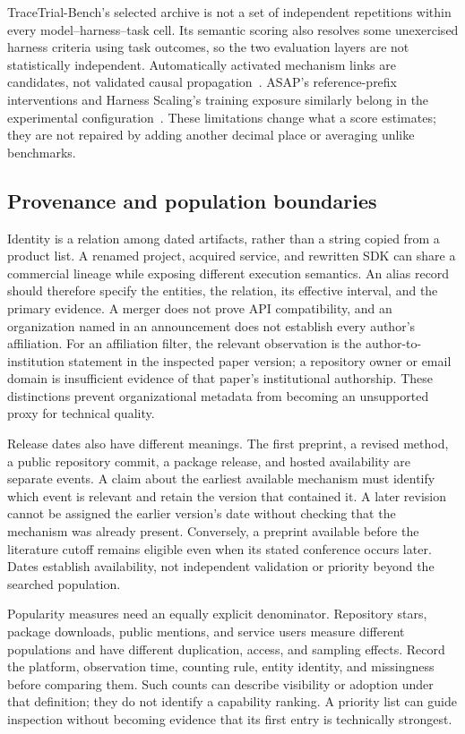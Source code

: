 TraceTrial-Bench's selected archive is not a set of independent repetitions within every model--harness--task cell. Its semantic scoring also resolves some unexercised harness criteria using task outcomes, so the two evaluation layers are not statistically independent. Automatically activated mechanism links are candidates, not validated causal propagation~\cite{ch01_tracetrial2026}. ASAP's reference-prefix interventions and Harness Scaling's training exposure similarly belong in the experimental configuration~\cite{ch01_asap2026,ch01_harnessscaling2026}. These limitations change what a score estimates; they are not repaired by adding another decimal place or averaging unlike benchmarks.

\subsection{Provenance and population boundaries}\label{sec:C01:provenance}
Identity is a relation among dated artifacts, rather than a string copied from a product list. A renamed project, acquired service, and rewritten SDK can share a commercial lineage while exposing different execution semantics. An alias record should therefore specify the entities, the relation, its effective interval, and the primary evidence. A merger does not prove API compatibility, and an organization named in an announcement does not establish every author's affiliation. For an affiliation filter, the relevant observation is the author-to-institution statement in the inspected paper version; a repository owner or email domain is insufficient evidence of that paper's institutional authorship. These distinctions prevent organizational metadata from becoming an unsupported proxy for technical quality.

Release dates also have different meanings. The first preprint, a revised method, a public repository commit, a package release, and hosted availability are separate events. A claim about the earliest available mechanism must identify which event is relevant and retain the version that contained it. A later revision cannot be assigned the earlier version's date without checking that the mechanism was already present. Conversely, a preprint available before the literature cutoff remains eligible even when its stated conference occurs later. Dates establish availability, not independent validation or priority beyond the searched population.

Popularity measures need an equally explicit denominator. Repository stars, package downloads, public mentions, and service users measure different populations and have different duplication, access, and sampling effects. Record the platform, observation time, counting rule, entity identity, and missingness before comparing them. Such counts can describe visibility or adoption under that definition; they do not identify a capability ranking. A priority list can guide inspection without becoming evidence that its first entry is technically strongest.

